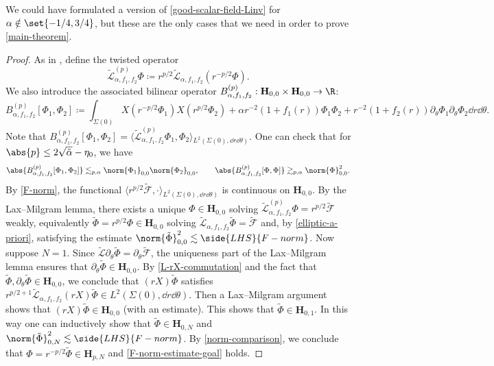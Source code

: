 \documentclass[10pt, reqno]{amsart}
\begin{document}
\begin{remark}
We could have formulated a version of \cref{good-scalar-field-Linv} for \(\alpha{} \notin
\set{-1/4,3/4}\), but these are the only cases that we need in order to prove
\cref{main-theorem}.
\end{remark}
\begin{proof}
As in \cite[Sec.~9.1]{GAJIC2023110058}, define the twisted operator
\begin{equation}
\tilde{\mathcal{L}}_{\alpha{},f_1,f_2}^{(p)}\Phi{}\coloneqq{}r^{p/2}\tilde{\mathcal{L}}_{\alpha{},f_1,f_2}(r^{-p/2}\Phi{}).
\end{equation}
We also introduce the associated bilinear operator \(B_{\alpha{},f_1,f_2}^{(p)}:\mathbf{H}_{0,0}\times \mathbf{H}_{0,0}\to \R\):
\begin{equation}
B_{\alpha{},f_1,f_2}^{(p)}[\Phi_1,\Phi_2]\coloneqq{}\int _{\Sigma{}(0)} X(r^{-p/2}\Phi{}_1)X(r^{p/2}\Phi{}_2) + \alpha{}r^{-2}(1+f_1(r))\Phi{}_1\Phi{}_2 + r^{-2}(1+f_2(r))\partial{}_\theta{}\Phi{}_1\partial{}_\theta{}\Phi{}_2\dd{}r\dd{}\theta{}.
\end{equation}
Note that \(B^{(p)}_{\alpha{},f_1,f_2}[\Phi{}_1,\Phi{}_2] = \langle{}
\tilde{\mathcal{L}}^{(p)}_{\alpha{},f_1,f_2}\Phi{}_1,\Phi{}_2\rangle{}_{L^2(\Sigma{}(0),\dd{}r\dd{}\theta{})}\).
One can check that for \(\abs{p}\le 2\sqrt{\tilde{\alpha{}}} - \eta_0\), we have
\begin{equation}
\abs{B_{\alpha{},f_1,f_2}^{(p)}[\Phi_1,\Phi_2]}\lesssim_{p,\alpha{}} \norm{\Phi{}_1}_{0,0}\norm{\Phi{}_2}_{0,0},\qquad \abs{B_{\alpha{},f_1,f_2}^{(p)}[\Phi,\Phi]}\gtrsim_{p,\alpha{}}\norm{\Phi{}}_{0,0}^2.
\end{equation}
By \cref{F-norm}, the functional \(\langle{}r^{p/2} \tilde{\mathcal{F}},\cdot
\rangle{}_{L^2(\Sigma{}(0),\dd{}r\dd{}\theta{})}\) is continuous on
\(\mathbf{H}_{0,0}\). By the Lax--Milgram lemma, there exists a unique
\(\Phi{}\in \mathbf{H}_{0,0}\) solving
\(\tilde{\mathcal{L}}_{\alpha{},f_1,f_2}^{(p)}\Phi{} = r^{p/2}
\tilde{\mathcal{F}}\) weakly, equivalently
\(\tilde{\Phi{}}=r^{p/2}\Phi{}\in\mathbf{H}_{0,0}\) solving
\(\tilde{\mathcal{L}}_{\alpha{},f_1,f_2}\tilde{\Phi{}} = \tilde{\mathcal{F}}\)
and, by \cref{elliptic-a-priori}, satisfying the estimate
\(\norm{\tilde{\Phi{}}}_{0,0}^2\lesssim \side{LHS}{F-norm}\). Now suppose \(N =
1\). Since \(\tilde{\mathcal{L}}\partial{}_\theta{}\tilde{\Phi{}} =
\partial{}_\theta{}\tilde{\mathcal{F}}\), the uniqueness part of the
Lax--Milgram lemma ensures that \(\partial_\theta{}\tilde{\Phi{}}\in
\mathbf{H}_{0,0}\). By \cref{L-rX-commutation} and the fact that
\(\tilde{\Phi{}},\partial_\theta{}\tilde{\Phi{}}\in \mathbf{H}_{0,0}\), we
conclude that \((rX)\tilde{\Phi{}}\) satisfies
\(r^{p/2+1}\tilde{\mathcal{L}}_{\alpha{},f_1,f_2}(rX)\tilde{\Phi{}}\in
L^2(\Sigma{}(0),\dd{}r\dd{}\theta{})\). Then a Lax--Milgram argument shows that
\((rX)\tilde{\Phi{}}\in \mathbf{H}_{0,0}\) (with an estimate). This shows that
\(\tilde{\Phi{}}\in \mathbf{H}_{0,1}\). In this way one can inductively show
that \(\tilde{\Phi{}}\in \mathbf{H}_{0,N}\) and
\(\norm{\tilde{\Phi{}}}_{0,N}^2\lesssim \side{LHS}{F-norm}\). By
\cref{norm-comparison}, we conclude that \(\Phi{} = r^{-p/2}\tilde{\Phi{}}\in
\mathbf{H}_{p,N}\) and \cref{F-norm-estimate-goal} holds.


\end{proof}
\end{document}
